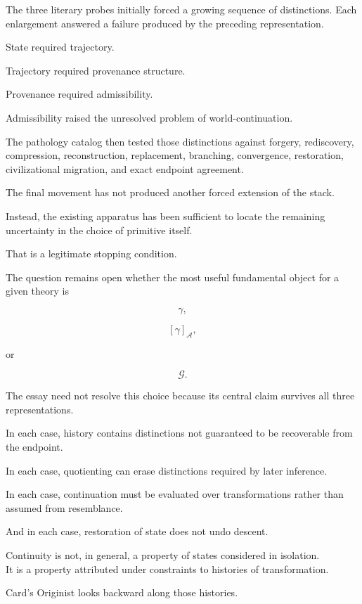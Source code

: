 \documentclass[
  11pt,
  a4paper,
  DIV=12,
  BCOR=0mm,
  parskip=half-
]{scrartcl}
\newcommand{\graphG}{\mathcal G}
\newcommand{\Adm}{\mathcal A}
\theoremstyle{definition}
\theoremstyle{plain}
\theoremstyle{remark}
\begin{document}
The three literary probes initially forced a growing sequence of distinctions.
Each enlargement answered a failure produced by the preceding representation.

State required trajectory.

Trajectory required provenance structure.

Provenance required admissibility.

Admissibility raised the unresolved problem of world-continuation.

The pathology catalog then tested those distinctions against forgery,
rediscovery, compression, reconstruction, replacement, branching, convergence,
restoration, civilizational migration, and exact endpoint agreement.

The final movement has not produced another forced extension of the stack.

Instead, the existing apparatus has been sufficient to locate the remaining
uncertainty in the choice of primitive itself.

That is a legitimate stopping condition.

The question remains open whether the most useful fundamental object for a
given theory is

\[
  \gamma,
\]

\[
  [\gamma]_{\Adm},
\]

or

\[
  \graphG.
\]

The essay need not resolve this choice because its central claim survives all
three representations.

In each case, history contains distinctions not guaranteed to be recoverable
from the endpoint.

In each case, quotienting can erase distinctions required by later inference.

In each case, continuation must be evaluated over transformations rather than
assumed from resemblance.

And in each case, restoration of state does not undo descent.

\begin{held}
\centering
Continuity is not, in general, a property of states considered in isolation.\\[4pt]
It is a property attributed under constraints to histories of transformation.
\end{held}

Card's Originist looks backward along those histories.
\end{document}
